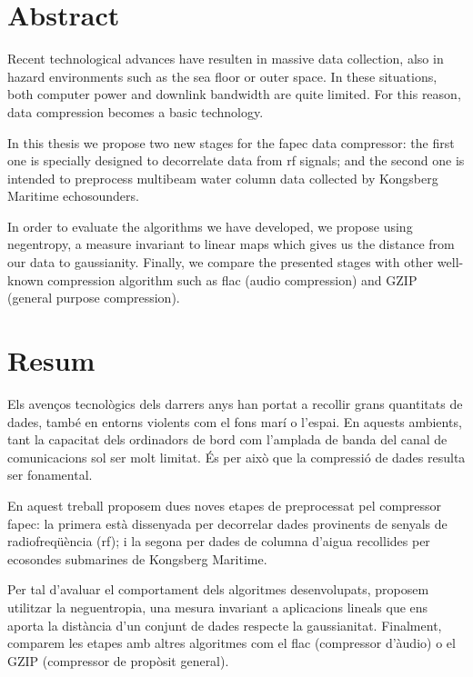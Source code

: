 \chapter*{Abstract}
Recent technological advances have resulten in massive data collection, also in hazard environments such as the sea floor or outer space. In these situations, both computer power and downlink bandwidth are quite limited. For this reason, data compression becomes a basic technology.

In this thesis we propose two new stages for the \acrshort{fapec} data compressor: the first one is specially designed to decorrelate data from \acrfull{rf} signals; and the second one is intended to preprocess multibeam water column data collected by Kongsberg Maritime echosounders.

In order to evaluate the algorithms we have developed, we propose using negentropy, a measure invariant to linear maps which gives us the distance from our data to gaussianity. Finally, we compare the presented stages with other well-known compression algorithm such as \acrshort{flac} (audio compression) and GZIP (general purpose compression).

\chapter*{Resum}
Els avenços tecnològics dels darrers anys han portat a recollir grans quantitats de dades, també en entorns violents com el fons marí o l’espai. En aquests ambients, tant la capacitat dels ordinadors de bord com l’amplada de banda del canal de comunicacions sol ser molt limitat. És per això que la compressió de dades resulta ser fonamental.

En aquest treball proposem dues noves etapes de preprocessat pel compressor \acrshort{fapec}: la primera està dissenyada per decorrelar dades provinents de senyals de radiofreqüència (\acrshort{rf}); i la segona per dades de columna d’aigua recollides per ecosondes submarines de Kongsberg Maritime.

Per tal d’avaluar el comportament dels algoritmes desenvolupats, proposem utilitzar la neguentropia, una mesura invariant a aplicacions lineals que ens aporta la distància d’un conjunt de dades respecte la gaussianitat. Finalment, comparem les etapes amb altres algoritmes com el \acrshort{flac} (compressor d’àudio) o el GZIP (compressor de propòsit general).